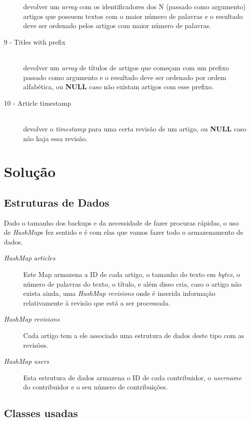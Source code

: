 \documentclass[a4paper]{article}
\begin{document}
\begin{description}
    devolver um \textit{array} com os identificadores dos N (passado como argumento) artigos que possuem textos com o maior número de palavras e o resultado deve ser ordenado pelos artigos com maior número de palavras.
    \item[9 - Titles with prefix]\hfill \\
    devolver um \textit{array} de títulos de artigos que começam com um prefixo passado como argumento e o resultado deve ser ordenado por ordem alfabética, ou \textbf{NULL} caso não existam artigos com esse prefixo.
    \item[10 - Article timestamp]\hfill \\
    devolver o \textit{timestamp} para uma certa revisão de um artigo, ou \textbf{NULL} caso não haja essa revisão.
\end{description}

\section{Solução}
\subsection{Estruturas de Dados}
Dado o tamanho dos backups e da necessidade de fazer procuras rápidas, o uso de \textit{HashMap}s fez sentido e é com elas que vamos fazer todo o armazenamento de dados.

\begin{description}
    \item[\textit{HashMap} \textit{articles}] Este Map armazena a ID de cada artigo, o tamanho do texto em \textit{bytes}, o número de palavras do texto, o título, e além disso cria, caso o artigo não exista ainda, uma \textit{\textit{HashMap} revisions} onde é inserida informação relativamente à revisão que está a ser processada.

    \item[\textit{HashMap} \textit{revisions}] Cada artigo tem a ele associado uma estrutura de dados deste tipo com as revisões.

    \item[\textit{HashMap} \textit{users}] Esta estrutura de dados armazena o ID de cada contribuidor, o \textit{username} do contribuidor e o seu número de contribuições.

\end{description}

\subsection{Classes usadas}
\end{document}
